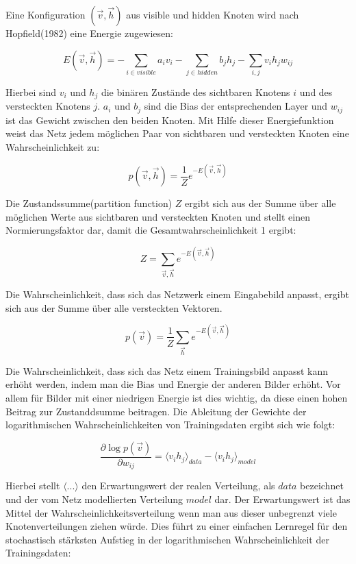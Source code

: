 \documentclass[12pt]{article}
\begin{document}
Eine Konfiguration $(\vec{v},\vec{h})$ aus visible und hidden Knoten wird nach Hopfield(1982) eine Energie zugewiesen:

\begin{equation}
E(\vec{v},\vec{h})= - \sum_{i \in visible} a_iv_i- \sum_{j \in hidden} b_j h_j - \sum_{i,j} v_i h_j w_{ij}
\end{equation}

Hierbei sind $v_i$ und $h_j$ die binären Zustände des sichtbaren Knotens $i$ und des versteckten Knotens $j$. $a_i$ und $b_j$ sind die Bias der entsprechenden Layer und $w_{ij}$ ist das Gewicht zwischen den beiden Knoten. Mit Hilfe dieser Energiefunktion weist das Netz jedem möglichen Paar von sichtbaren und versteckten Knoten eine Wahrscheinlichkeit zu:

\begin{equation}
p(\vec{v},\vec{h})= \frac{1}{Z} e^{-E(\vec{v},\vec{h})}
\end{equation}

Die Zustandssumme(partition function) $Z$ ergibt sich aus der Summe über alle möglichen Werte aus sichtbaren und versteckten Knoten und stellt einen Normierungsfaktor dar, damit die Gesamtwahrscheinlichkeit 1 ergibt:

\begin{equation}
Z=\sum_{\vec{v},\vec{h}} e^{-E(\vec{v},\vec{h})}
\end{equation}

Die Wahrscheinlichkeit, dass sich das Netzwerk einem Eingabebild anpasst, ergibt sich aus der Summe über alle versteckten Vektoren. \cite{guide}

\begin{equation}
p(\vec{v})= \frac{1}{Z} \sum_{\vec{h}} e^{-E(\vec{v},\vec{h})}
\end{equation}

Die Wahrscheinlichkeit, dass sich das Netz einem Trainingsbild anpasst kann erhöht werden, indem man die Bias und Energie der anderen Bilder erhöht. Vor allem für Bilder mit einer niedrigen Energie ist dies wichtig, da diese einen hohen Beitrag zur Zustanddsumme beitragen. Die Ableitung der Gewichte der logarithmischen Wahrscheinlichkeiten von Trainingsdaten ergibt sich wie folgt:

\begin{equation}
\frac{\partial \log p(\vec{v})}{\partial w_{ij}} = \langle v_ih_j \rangle_{data} - \langle v_i h_j \rangle_{model}
\end{equation}

Hierbei stellt $\langle...\rangle$ den Erwartungswert der realen Verteilung, als $data$ bezeichnet und der vom Netz modellierten Verteilung $model$ dar. Der Erwartungswert ist das Mittel der Wahrscheinlichkeitsverteilung wenn man aus dieser unbegrenzt viele Knotenverteilungen ziehen würde. Dies führt zu einer einfachen Lernregel für den stochastisch stärksten Aufstieg in der logarithmischen Wahrscheinlichkeit der Trainingsdaten:
\end{document}
